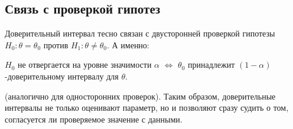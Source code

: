 \documentclass[10pt]{article}
\begin{document}
\subsection{Связь с проверкой гипотез}
Доверительный интервал тесно связан с двусторонней проверкой гипотезы $H_0: \theta = \theta_0$ против $H_1: \theta \neq \theta_0$. А именно:
\begin{center}
$H_0$ не отвергается на уровне значимости $\alpha$ $\Longleftrightarrow$ $\theta_0$ принадлежит $(1-\alpha)$-доверительному интервалу для $\theta$.
\end{center}

(аналогично для односторонних проверок). Таким образом, доверительные интервалы не только оценивают параметр, но и позволяют сразу судить о том, согласуется ли проверяемое значение с данными.
\end{document}
